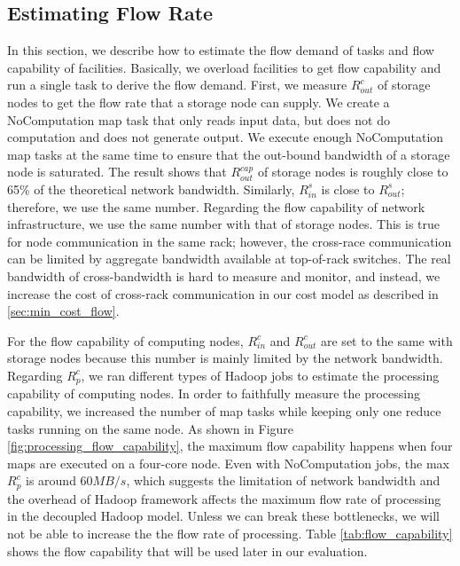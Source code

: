 \subsection{Estimating Flow Rate}
In this section, we describe how to estimate the flow demand of tasks and flow capability of facilities.
Basically, we overload facilities to get flow capability and run a single task to derive the flow demand.
First, we measure $R^{c}_{out}$ of storage nodes to get the flow rate that a storage node can supply.
We create a NoComputation map task that only reads input data, but does not do computation and does not generate output.
We execute enough NoComputation map tasks at the same time to ensure that the out-bound bandwidth of a storage node is saturated.
The result shows that $R^{cap}_{out}$ of storage nodes is roughly close to 65\% of the theoretical network bandwidth.
Similarly, $R^{s}_{in}$  is close to $R^{s}_{out}$; therefore, we use the same number.
Regarding the flow capability of network infrastructure, we use the same number with that of storage nodes.
This is true for node communication in the same rack; however, the cross-race communication can be limited by aggregate bandwidth available at top-of-rack switches.
The real bandwidth of cross-bandwidth is hard to measure and monitor, and instead, we increase the cost of cross-rack communication in our cost model as described in \ref{sec:min_cost_flow}.

For the flow capability of computing nodes, $R^{c}_{in}$ and  $R^{c}_{out}$ are set to the same with storage nodes because this number is mainly limited by the network bandwidth.
Regarding $R^{c}_{p}$, we ran different types of Hadoop jobs to estimate the processing capability of computing nodes.
In order to faithfully measure the processing capability, we increased the number of map tasks while keeping only one reduce tasks running on the same node.
As shown in Figure \ref{fig:processing_flow_capability}, the maximum flow capability happens when four maps are executed on a four-core node.
Even with NoComputation jobs, the max $R^{c}_{p}$ is around $60MB/s$, which suggests the limitation of network bandwidth and the overhead of Hadoop framework affects the maximum flow rate of processing in the decoupled Hadoop model.
Unless we can break these bottlenecks, we will not be able to increase the the flow rate of processing.
Table \ref{tab:flow_capability} shows the flow capability that will be used later in our evaluation.


